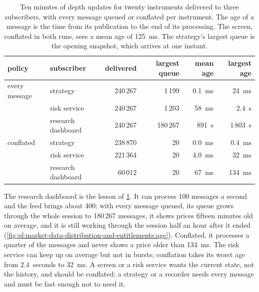 \label{lst:pl:market-data-distribution-and-entitlements:queue}

\begin{table}[htbp]
\centering\small
\begin{tabular}{llrrrr}
\toprule
policy & subscriber & delivered & largest queue & mean age & largest age\\
\midrule
every message & strategy & 240\,267 & 1\,199 & 0.1~ms & 24~ms\\
 & risk service & 240\,267 & 1\,203 & 58~ms & 2.4~s\\
 & research dashboard & 240\,267 & 180\,267 & 891~s & 1\,803~s\\
conflated & strategy & 238\,870 & 20 & 0.0~ms & 0.4~ms\\
 & risk service & 221\,364 & 20 & 4.0~ms & 32~ms\\
 & research dashboard & 60\,012 & 20 & 67~ms & 134~ms\\
\bottomrule
\end{tabular}
\caption{Ten minutes of depth updates for twenty instruments delivered to three subscribers, with every message queued or conflated per
instrument. The age of a message is the time from its publication to the end of its processing. The screen, conflated in both runs, sees a
mean age of 125~ms. The strategy's largest queue is the opening snapshot, which arrives at one instant.}
\label{tab:pl:market-data-distribution-and-entitlements:policies}
\end{table}

The research dashboard is the lesson of \cref{tab:pl:market-data-distribution-and-entitlements:policies}. It can process 100 messages a
second and the feed brings about 400: with every message queued, its queue grows through the whole session to 180\,267 messages, it shows prices
fifteen minutes old on average, and it is still working through the session half an hour after it ended
(\cref{fig:pl:market-data-distribution-and-entitlements:age}). Conflated, it processes a quarter of the messages and never shows a price
older than 134~ms. The risk service can keep up on average but not in bursts; conflation takes its worst age from 2.4~seconds to 32~ms. A
screen or a risk service wants the current state, not the history, and should be conflated; a strategy or a recorder needs every message
and must be fast enough not to need it.

